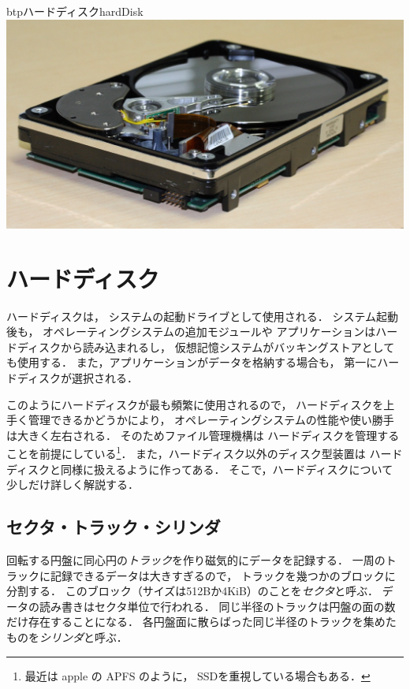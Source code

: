 \begin{enumerate}
  \begin{myfig}{btp}{ハードディスク}{hardDisk}
    \includegraphics[scale=0.3]{Fig/hardDisk.jpg}
  \end{myfig}

\end{enumerate}

\section{ハードディスク}
ハードディスクは，
システムの起動ドライブとして使用される．
システム起動後も，
オペレーティングシステムの追加モジュールや
アプリケーションはハードディスクから読み込まれるし，
仮想記憶システムがバッキングストアとしても使用する．
また，アプリケーションがデータを格納する場合も，
第一にハードディスクが選択される．

このようにハードディスクが最も頻繁に使用されるので，
ハードディスクを上手く管理できるかどうかにより，
オペレーティングシステムの性能や使い勝手は大きく左右される．
そのためファイル管理機構は
ハードディスクを管理することを前提にしている\footnote{
最近は apple の APFS \cite{appleFileSystem}のように，
SSDを重視している場合もある．}．
また，ハードディスク以外のディスク型装置は
ハードディスクと同様に扱えるように作ってある．
そこで，ハードディスクについて少しだけ詳しく解説する．

\subsection{セクタ・トラック・シリンダ}
回転する円盤に同心円の\emph{トラック}を作り磁気的にデータを記録する．
一周のトラックに記録できるデータは大きすぎるので，
トラックを幾つかのブロックに分割する．
このブロック（サイズは512Bか4KiB）のことを\emph{セクタ}と呼ぶ．
データの読み書きはセクタ単位で行われる．
同じ半径のトラックは円盤の面の数だけ存在することになる．
各円盤面に散らばった同じ半径のトラックを集めたものを\emph{シリンダ}と呼ぶ．

